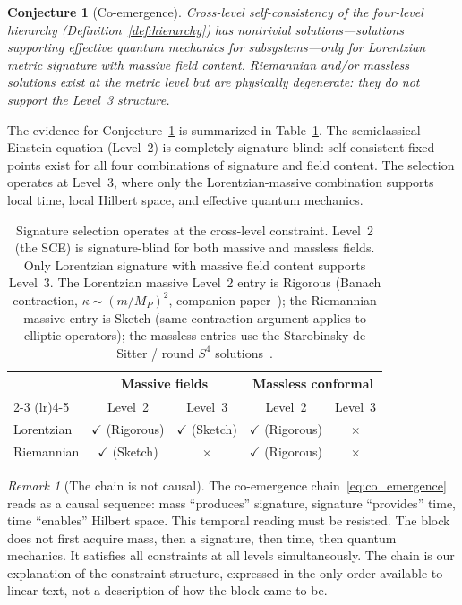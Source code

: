 \documentclass[12pt,a4paper]{article}
\newtheorem{conjecture}{Conjecture}
\theoremstyle{definition}
\theoremstyle{remark}
\newtheorem{remark}{Remark}
\begin{document}
\begin{conjecture}[Co-emergence]
\label{conj:coemergence}
Cross-level self-consistency of the four-level hierarchy
(Definition~\ref{def:hierarchy}) has nontrivial solutions---solutions
supporting effective quantum mechanics for subsystems---only for
Lorentzian metric signature with massive field content. Riemannian
and/or massless solutions exist at the metric level but are physically
degenerate: they do not support the Level~3 structure.
\end{conjecture}

The evidence for Conjecture~\ref{conj:coemergence} is summarized in
Table~\ref{tab:signature}. The semiclassical Einstein equation (Level~2)
is completely signature-blind: self-consistent fixed points exist for
all four combinations of signature and field content. The selection
operates at Level~3, where only the Lorentzian-massive combination
supports local time, local Hilbert space, and effective quantum
mechanics.

\begin{table}[h]
\centering
\begin{tabular}{lcccc}
\toprule
& \multicolumn{2}{c}{Massive fields} & \multicolumn{2}{c}{Massless conformal} \\
\cmidrule(lr){2-3} \cmidrule(lr){4-5}
& Level~2 & Level~3 & Level~2 & Level~3 \\
\midrule
Lorentzian & $\checkmark$ (Rigorous) & $\checkmark$ (Sketch) & $\checkmark$ (Rigorous) & $\times$ \\
Riemannian & $\checkmark$ (Sketch) & $\times$ & $\checkmark$ (Rigorous) & $\times$ \\
\bottomrule
\end{tabular}
\caption{Signature selection operates at the cross-level constraint. Level~2
(the SCE) is signature-blind for both massive and massless fields. Only
Lorentzian signature with massive field content supports Level~3.
The Lorentzian massive Level~2 entry is Rigorous (Banach contraction,
$\kappa \sim (m/M_P)^2$, companion paper~\cite{fixed_point}); the
Riemannian massive entry is Sketch (same contraction argument applies to
elliptic operators); the massless entries use the Starobinsky de Sitter /
round $S^4$ solutions~\cite{starobinsky,bunch_davies}.}
\label{tab:signature}
\end{table}

\begin{remark}[The chain is not causal]
\label{rem:temporal}
The co-emergence chain~\eqref{eq:co_emergence} reads as a causal
sequence: mass ``produces'' signature, signature ``provides'' time, time
``enables'' Hilbert space. This temporal reading must be resisted. The
block does not first acquire mass, then a signature, then time, then
quantum mechanics. It satisfies all constraints at all levels
simultaneously. The chain is our explanation of the constraint structure,
expressed in the only order available to linear text, not a description
of how the block came to be.
\end{remark}
\end{document}
